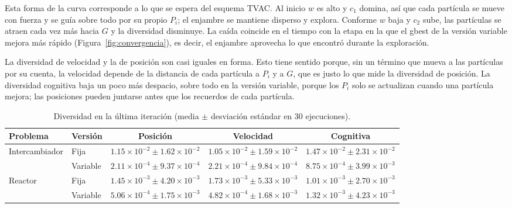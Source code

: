 Esta forma de la curva corresponde a lo que se espera del esquema TVAC. Al inicio $w$ es alto y $c_1$ domina, así que cada partícula se mueve con fuerza y se guía sobre todo por su propio $P_i$; el enjambre se mantiene disperso y explora. Conforme $w$ baja y $c_2$ sube, las partículas se atraen cada vez más hacia $G$ y la diversidad disminuye. La caída coincide en el tiempo con la etapa en la que el gbest de la versión variable mejora más rápido (Figura~\ref{fig:convergencia}), es decir, el enjambre aprovecha lo que encontró durante la exploración.

La diversidad de velocidad y la de posición son casi iguales en forma. Esto tiene sentido porque, sin un término que mueva a las partículas por su cuenta, la velocidad depende de la distancia de cada partícula a $P_i$ y a $G$, que es justo lo que mide la diversidad de posición. La diversidad cognitiva baja un poco más despacio, sobre todo en la versión variable, porque los $P_i$ solo se actualizan cuando una partícula mejora; las posiciones pueden juntarse antes que los recuerdos de cada partícula.

\begin{table}[H]
\centering
\caption{Diversidad en la última iteración (media $\pm$ desviación estándar en 30 ejecuciones).}
\label{tab:diversidad_final}
\small
\setlength{\tabcolsep}{4pt}
\begin{adjustbox}{max width=\textwidth}
\begin{tabular}{llccc}
\toprule
Problema & Versión & Posición & Velocidad & Cognitiva \\
\midrule
\multirow{2}{*}{Intercambiador} & Fija & $1.15\times10^{-2} \pm 1.62\times10^{-2}$ & $1.05\times10^{-2} \pm 1.59\times10^{-2}$ & $1.47\times10^{-2} \pm 2.31\times10^{-2}$ \\
 & Variable & $2.11\times10^{-4} \pm 9.37\times10^{-4}$ & $2.21\times10^{-4} \pm 9.84\times10^{-4}$ & $8.75\times10^{-4} \pm 3.99\times10^{-3}$ \\
\midrule
\multirow{2}{*}{Reactor} & Fija & $1.45\times10^{-3} \pm 4.20\times10^{-3}$ & $1.73\times10^{-3} \pm 5.33\times10^{-3}$ & $1.01\times10^{-3} \pm 2.70\times10^{-3}$ \\
 & Variable & $5.06\times10^{-4} \pm 1.75\times10^{-3}$ & $4.82\times10^{-4} \pm 1.68\times10^{-3}$ & $1.32\times10^{-3} \pm 4.23\times10^{-3}$ \\
\bottomrule
\end{tabular}
\end{adjustbox}
\end{table}


